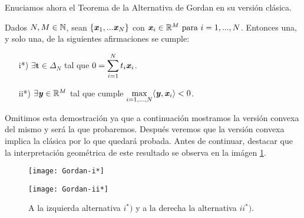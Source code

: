 \bigskip
Enuciamos ahora el Teorema de la Alternativa de Gordan en su versión clásica.
\bigskip
\begin{teoremaBox}\label{GordanClasic}
	Dados $N, M \in \mathbb{N}   $, sean $ \{\textbf{\emph{x}}_1,...\textbf{\emph{x}}_N\}$ con $ \textbf{\emph{x}}_i \in \mathbb{R}^M \text{ para } i=1,...,N$. Entonces una, y solo una, de la siguientes afirmaciones se cumple:
	
	\begin{itemize}
		\item[i*)] $ \exists \mathbf{t} \in \Delta_N $ tal que  $  0 = \displaystyle \sum_{i=1}^{N}{t_i \textbf{\emph{x}}_i}$.
		\item[ii*)] $ \exists \textbf{\emph{y}} \in \mathbb{R}^M $ tal que cumple $ \displaystyle \max_{i=1,...,N} \langle \textbf{\emph{y}}, \textbf{\emph{x}}_i \rangle < 0 $.
	\end{itemize}
\end{teoremaBox}
\bigskip
Omitimos esta demostración ya que a continuación mostramos la versión convexa del mismo y será la que probaremos. Después veremos que la versión convexa  implica la clásica por lo que quedará probada. Antes de continuar, destacar que la interpretación geométrica de este resultado se observa en la imágen \ref{fig:gordan-clasic}.

\begin{figure}[h!]
	\begin{minipage}{0.5\textwidth}
		\centering
		\texttt{[image: Gordan-i*]} 
	\end{minipage}
	\begin{minipage}{0.5\textwidth}
		\texttt{[image: Gordan-ii*]}
	\end{minipage}
	\caption{A la izquierda alternativa $ i^*) $ y a la derecha la alternativa $ ii^*) $.}
	\label{fig:gordan-clasic}
\end{figure}

